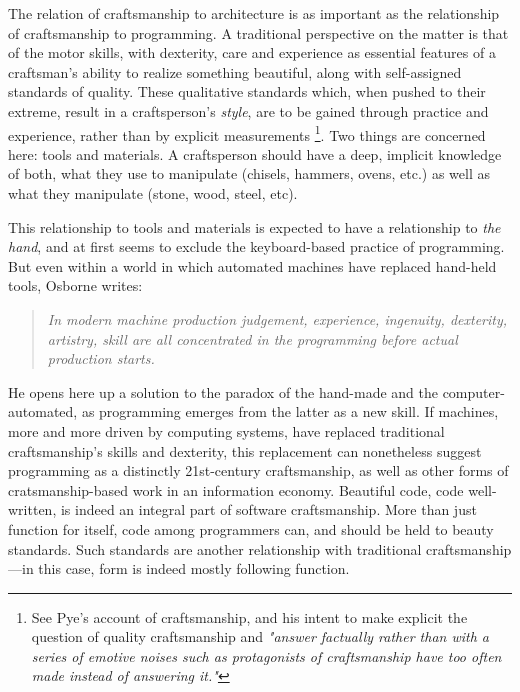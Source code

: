 \documentclass{article}
\begin{document}
The relation of craftsmanship to architecture is as important as the relationship of craftsmanship to programming. A traditional perspective on the matter is that of the motor skills, with dexterity, care and experience as essential features of a craftsman's ability to realize something beautiful\cite{osborne_aesthetic_1977}, along with self-assigned standards of quality\cite{sennett_craftsman_2009}. These qualitative standards which, when pushed to their extreme, result in a craftsperson's \emph{style}, are to be gained through practice and experience, rather than by explicit measurements\cite{pye_nature_2008} \footnote{See Pye's account of craftsmanship, and his intent to make explicit the question of quality craftsmanship and \emph{"answer factually rather than with a series of emotive noises such as protagonists of craftsmanship have too often made instead of answering it."}}. Two things are concerned here: tools and materials\cite{pye_nature_2008}. A craftsperson should have a deep, implicit knowledge of both, what they use to manipulate (chisels, hammers, ovens, etc.) as well as what they manipulate (stone, wood, steel, etc).

This relationship to tools and materials is expected to have a relationship to \emph{the hand}, and at first seems to exclude the keyboard-based practice of programming. But even within a world in which automated machines have replaced hand-held tools, Osborne writes:

\begin{quote}
    \textit{In modern machine production judgement, experience, ingenuity, dexterity, artistry, skill are all concentrated in the programming before actual production starts.\cite{osborne_aesthetic_1977}}
\end{quote}

He opens here up a solution to the paradox of the hand-made and the computer-automated, as programming emerges from the latter as a new skill. If machines, more and more driven by computing systems, have replaced traditional craftsmanship's skills and dexterity, this replacement can nonetheless suggest programming as a distinctly 21st-century craftsmanship, as well as other forms of cratsmanship-based work in an information economy.
Beautiful code, code well-written, is indeed an integral part of software craftsmanship\cite{oram_beautiful_2007}. More than just function for itself, code among programmers can, and should be held to beauty standards\cite{pineiro_aesthetics_2003}. Such standards are another relationship with traditional craftsmanship—in this case, form is indeed mostly following function.
\end{document}
